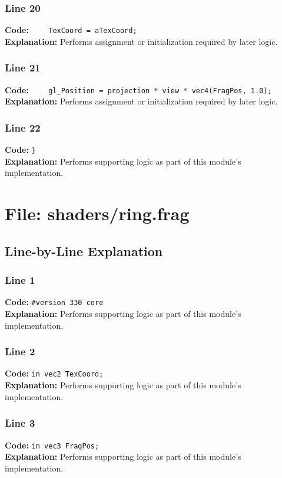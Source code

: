 \documentclass[11pt,a4paper]{article}
\begin{document}
\subsubsection*{Line 20}
\textbf{Code:} \verb|    TexCoord = aTexCoord;|\\
\textbf{Explanation:} Performs assignment or initialization required by later logic.

\subsubsection*{Line 21}
\textbf{Code:} \verb|    gl_Position = projection * view * vec4(FragPos, 1.0);|\\
\textbf{Explanation:} Performs assignment or initialization required by later logic.

\subsubsection*{Line 22}
\textbf{Code:} \verb|}|\\
\textbf{Explanation:} Performs supporting logic as part of this module's implementation.

\newpage
\section{File: shaders/ring.frag}
\subsection{Line-by-Line Explanation}
\subsubsection*{Line 1}
\textbf{Code:} \verb|#version 330 core|\\
\textbf{Explanation:} Performs supporting logic as part of this module's implementation.

\subsubsection*{Line 2}
\textbf{Code:} \verb|in vec2 TexCoord;|\\
\textbf{Explanation:} Performs supporting logic as part of this module's implementation.

\subsubsection*{Line 3}
\textbf{Code:} \verb|in vec3 FragPos;|\\
\textbf{Explanation:} Performs supporting logic as part of this module's implementation.
\end{document}
